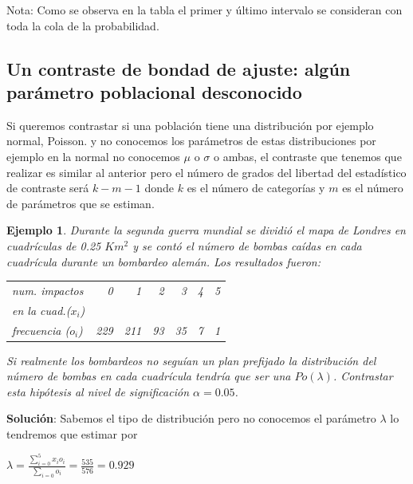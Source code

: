 \documentclass[12pt]{report}
\newtheorem{example}[definition]{Ejemplo}
\begin{document}
     Nota: Como se observa en la tabla
     el primer y último intervalo se consideran con toda la cola de
     la probabilidad.

 \subsection{Un contraste de bondad de ajuste: algún parámetro
           poblacional desconocido}

       Si queremos contrastar si una población tiene una distribución
       por ejemplo normal,  Poisson. y no conocemos los parámetros
       de estas distribuciones por ejemplo en la normal no conocemos
       $\mu$ o $\sigma$ o ambas, el contraste que tenemos que realizar
       es similar al anterior pero el número de grados del libertad del
       estadístico de contraste será $k-m-1$ donde $k$ es el número de
       categorías y $m$ es el número de parámetros que se estiman.

       \begin{example}
           Durante la segunda guerra mundial se dividió el mapa de Londres
           en cuadrículas de 0.25 $Km^2$ y se contó el número de bombas
           caídas en cada cuadrícula durante un bombardeo  alemán. Los
           resultados fueron:
\begin{center}
           \begin{tabular}{|l|rrrrrr|}
           \hline
           num. impactos  & 0 & 1 & 2 & 3 & 4 & 5 \\
           en la cuad.($x_{i}$)& & & & & & \\
           \hline
           frecuencia ($o_{i}$) & 229 & 211 & 93 & 35 & 7 & 1 \\
           \hline
           \end{tabular}
\end{center}

           Si realmente  los bombardeos no seguían un plan prefijado la
           distribución del número de bombas en cada cuadrícula tendría
           que ser una $Po(\lambda)$. Contrastar esta hipótesis al nivel
           de significación $\alpha=0.05$.
        \end{example}
           \textbf{Solución}:
           Sabemos el tipo de distribución pero no conocemos el
           parámetro $\lambda$ lo tendremos que estimar por

           $\lambda=\frac{\sum_{i=0}^{5} x_{i } o_{i}}{\sum_{i=0}
           o_{i}}=\frac{535}{576}=0.929$
\end{document}
